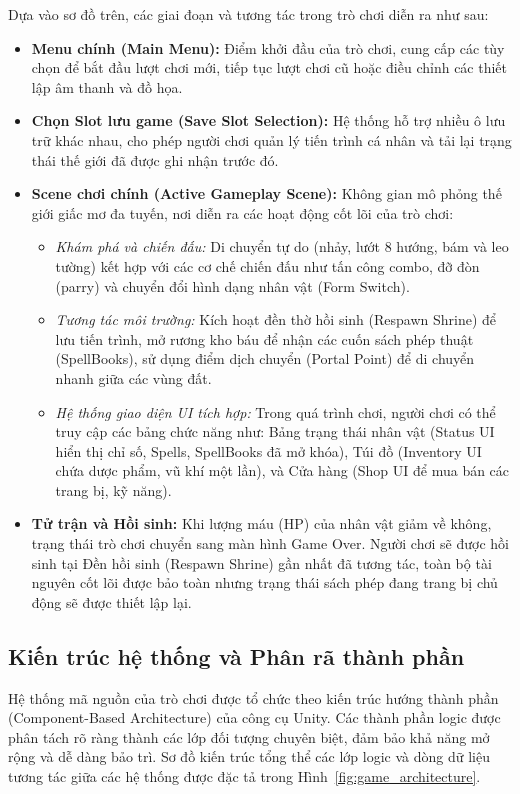 \documentclass[../DoAn.tex]{subfiles}
\begin{document}
Dựa vào sơ đồ trên, các giai đoạn và tương tác trong trò chơi diễn ra như sau:
\begin{itemize}
    \item \textbf{Menu chính (Main Menu):} Điểm khởi đầu của trò chơi, cung cấp các tùy chọn để bắt đầu lượt chơi mới, tiếp tục lượt chơi cũ hoặc điều chỉnh các thiết lập âm thanh và đồ họa.
    \item \textbf{Chọn Slot lưu game (Save Slot Selection):} Hệ thống hỗ trợ nhiều ô lưu trữ khác nhau, cho phép người chơi quản lý tiến trình cá nhân và tải lại trạng thái thế giới đã được ghi nhận trước đó.
    \item \textbf{Scene chơi chính (Active Gameplay Scene):} Không gian mô phỏng thế giới giấc mơ đa tuyến, nơi diễn ra các hoạt động cốt lõi của trò chơi:
    \begin{itemize}
        \item \textit{Khám phá và chiến đấu:} Di chuyển tự do (nhảy, lướt 8 hướng, bám và leo tường) kết hợp với các cơ chế chiến đấu như tấn công combo, đỡ đòn (parry) và chuyển đổi hình dạng nhân vật (Form Switch).
        \item \textit{Tương tác môi trường:} Kích hoạt đền thờ hồi sinh (Respawn Shrine) để lưu tiến trình, mở rương kho báu để nhận các cuốn sách phép thuật (SpellBooks), sử dụng điểm dịch chuyển (Portal Point) để di chuyển nhanh giữa các vùng đất.
        \item \textit{Hệ thống giao diện UI tích hợp:} Trong quá trình chơi, người chơi có thể truy cập các bảng chức năng như: Bảng trạng thái nhân vật (Status UI hiển thị chỉ số, Spells, SpellBooks đã mở khóa), Túi đồ (Inventory UI chứa dược phẩm, vũ khí một lần), và Cửa hàng (Shop UI để mua bán các trang bị, kỹ năng).
    \end{itemize}
    \item \textbf{Tử trận và Hồi sinh:} Khi lượng máu (HP) của nhân vật giảm về không, trạng thái trò chơi chuyển sang màn hình Game Over. Người chơi sẽ được hồi sinh tại Đền hồi sinh (Respawn Shrine) gần nhất đã tương tác, toàn bộ tài nguyên cốt lõi được bảo toàn nhưng trạng thái sách phép đang trang bị chủ động sẽ được thiết lập lại.
\end{itemize}

\subsection{Kiến trúc hệ thống và Phân rã thành phần}
\label{subsection:3.1.2}

Hệ thống mã nguồn của trò chơi được tổ chức theo kiến trúc hướng thành phần (Component-Based Architecture) của công cụ Unity. Các thành phần logic được phân tách rõ ràng thành các lớp đối tượng chuyên biệt, đảm bảo khả năng mở rộng và dễ dàng bảo trì. Sơ đồ kiến trúc tổng thể các lớp logic và dòng dữ liệu tương tác giữa các hệ thống được đặc tả trong Hình~\ref{fig:game_architecture}.
\end{document}
